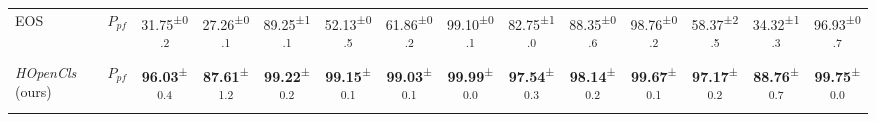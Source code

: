 \begin{table*}[!t]
{\begin{tabular}{lccccccccccccc}
    EOS~\cite{EOS}                                          & $P_{pf}$               & 31.75\textsuperscript{±0.2}          & 27.26\textsuperscript{±0.1}          & 89.25\textsuperscript{±1.1}          & 52.13\textsuperscript{±0.5}          & 61.86\textsuperscript{±0.2}          & 99.10\textsuperscript{±0.1}          & 82.75\textsuperscript{±1.0}          & 88.35\textsuperscript{±0.6}          & 98.76\textsuperscript{±0.2}          & 58.37\textsuperscript{±2.5}          & 34.32\textsuperscript{±1.3}          & 96.93\textsuperscript{±0.7}           \\
    \textit{HOpenCls} (ours)                                     & $P_{pf}$               & \textbf{96.03}\textsuperscript{±0.4} & \textbf{87.61}\textsuperscript{±1.2} & \textbf{99.22}\textsuperscript{±0.2} & \textbf{99.15}\textsuperscript{±0.1} & \textbf{99.03}\textsuperscript{±0.1} & \textbf{99.99}\textsuperscript{±0.0} & \textbf{97.54}\textsuperscript{±0.3} & \textbf{98.14}\textsuperscript{±0.2} & \textbf{99.67}\textsuperscript{±0.1} & \textbf{97.17}\textsuperscript{±0.2} & \textbf{88.76}\textsuperscript{±0.7} & \textbf{99.75}\textsuperscript{±0.0}  \\
    \hline
    \end{tabular}
    }
\end{table*}